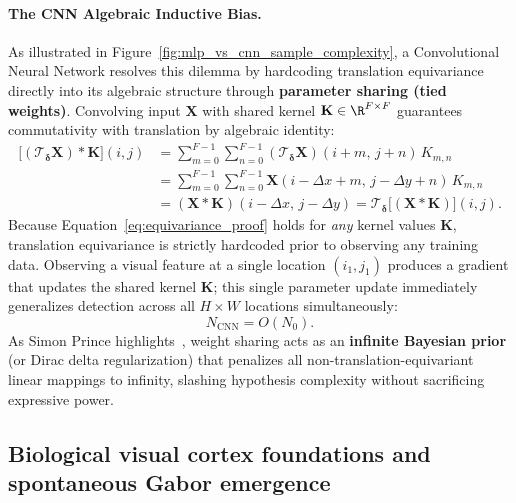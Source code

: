 \paragraph{The CNN Algebraic Inductive Bias.}
As illustrated in Figure~\ref{fig:mlp_vs_cnn_sample_complexity}, a Convolutional Neural Network resolves this dilemma by hardcoding translation equivariance directly into its algebraic structure through \textbf{parameter sharing (tied weights)}. Convolving input $\mathbf{X}$ with shared kernel $\mathbf{K} \in \R^{F \times F}$ guarantees commutativity with translation by algebraic identity:
\begin{equation}
\begin{aligned}
\big[ (\mathcal{T}_{\boldsymbol{\delta}} \mathbf{X}) * \mathbf{K} \big](i, j) &= \sum_{m=0}^{F-1} \sum_{n=0}^{F-1} (\mathcal{T}_{\boldsymbol{\delta}} \mathbf{X})(i+m, \, j+n) \, K_{m, n} \\
&= \sum_{m=0}^{F-1} \sum_{n=0}^{F-1} \mathbf{X}(i - \Delta x + m, \, j - \Delta y + n) \, K_{m, n} \\
&= (\mathbf{X} * \mathbf{K})(i - \Delta x, \, j - \Delta y) = \mathcal{T}_{\boldsymbol{\delta}} \big[ (\mathbf{X} * \mathbf{K}) \big](i, j).
\end{aligned}
\label{eq:equivariance_proof}
\end{equation}
Because Equation~\eqref{eq:equivariance_proof} holds for \textit{any} kernel values $\mathbf{K}$, translation equivariance is strictly hardcoded prior to observing any training data. Observing a visual feature at a single location $(i_1, j_1)$ produces a gradient that updates the shared kernel $\mathbf{K}$; this single parameter update immediately generalizes detection across all $H \times W$ locations simultaneously:
\begin{equation}
N_{\text{CNN}} = O(N_0).
\label{eq:sample_complexity_cnn}
\end{equation}
As Simon Prince highlights~\cite{prince2023understanding}, weight sharing acts as an \textbf{infinite Bayesian prior} (or Dirac delta regularization) that penalizes all non-translation-equivariant linear mappings to infinity, slashing hypothesis complexity without sacrificing expressive power.

\subsection{Biological visual cortex foundations and spontaneous Gabor emergence}
\label{sec:biological_visual_cortex_and_gabor_emergence}

